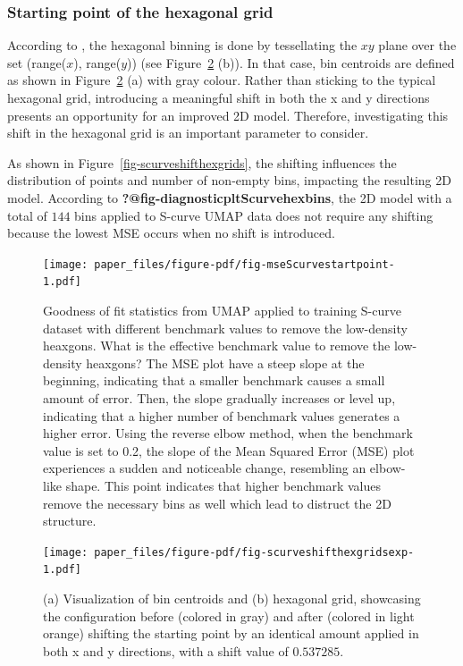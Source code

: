 \documentclass[
  12pt]{article}
\begin{document}
\hypertarget{starting-point-of-the-hexagonal-grid}{%
\subsubsection{Starting point of the hexagonal
grid}\label{starting-point-of-the-hexagonal-grid}}

According to \citet{Dan2023}, the hexagonal binning is done by
tessellating the \(xy\) plane over the set (range(\(x\)), range(\(y\)))
(see Figure~\ref{fig-scurveshifthexgridsexp} (b)). In that case, bin
centroids are defined as shown in
Figure~\ref{fig-scurveshifthexgridsexp} (a) with gray colour. Rather
than sticking to the typical hexagonal grid, introducing a meaningful
shift in both the x and y directions presents an opportunity for an
improved 2D model. Therefore, investigating this shift in the hexagonal
grid is an important parameter to consider.

As shown in Figure~\ref{fig-scurveshifthexgrids}, the shifting
influences the distribution of points and number of non-empty bins,
impacting the resulting 2D model. According to
\textbf{?@fig-diagnosticpltScurvehexbins}, the 2D model with a total of
\(144\) bins applied to S-curve UMAP data does not require any shifting
because the lowest MSE occurs when no shift is introduced.

\begin{figure}[H]

{\centering \texttt{[image: paper\_files/figure-pdf/fig-mseScurvestartpoint-1.pdf]}

}

\caption{\label{fig-mseScurvestartpoint}Goodness of fit statistics from
UMAP applied to training S-curve dataset with different benchmark values
to remove the low-density heaxgons. What is the effective benchmark
value to remove the low-density heaxgons? The MSE plot have a steep
slope at the beginning, indicating that a smaller benchmark causes a
small amount of error. Then, the slope gradually increases or level up,
indicating that a higher number of benchmark values generates a higher
error. Using the reverse elbow method, when the benchmark value is set
to 0.2, the slope of the Mean Squared Error (MSE) plot experiences a
sudden and noticeable change, resembling an elbow-like shape. This point
indicates that higher benchmark values remove the necessary bins as well
which lead to distruct the 2D structure.}

\end{figure}

\begin{figure}[H]

{\centering \texttt{[image: paper\_files/figure-pdf/fig-scurveshifthexgridsexp-1.pdf]}

}

\caption{\label{fig-scurveshifthexgridsexp}(a) Visualization of bin
centroids and (b) hexagonal grid, showcasing the configuration before
(colored in gray) and after (colored in light orange) shifting the
starting point by an identical amount applied in both x and y
directions, with a shift value of \(0.537285\).}

\end{figure}
\end{document}
